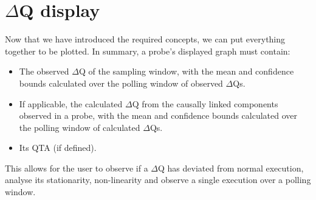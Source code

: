 \section{$\Delta$Q display}
    Now that we have introduced the required concepts, we can put everything together to be plotted. In summary, a probe's displayed graph must contain:
    \begin{itemize}
        \item The observed $\Delta$Q of the sampling window, with the mean and confidence bounds calculated over the polling window of observed $\Delta$Qs.
        \item If applicable, the calculated $\Delta$Q from the causally linked components observed in a probe, with the mean and confidence bounds calculated over the polling window of calculated $\Delta$Qs.
        \item Its QTA (if defined).
    \end{itemize}
    This allows for the user to observe if a $\Delta$Q has deviated from normal execution, analyse its stationarity, non-linearity and observe a single execution over a polling window.


